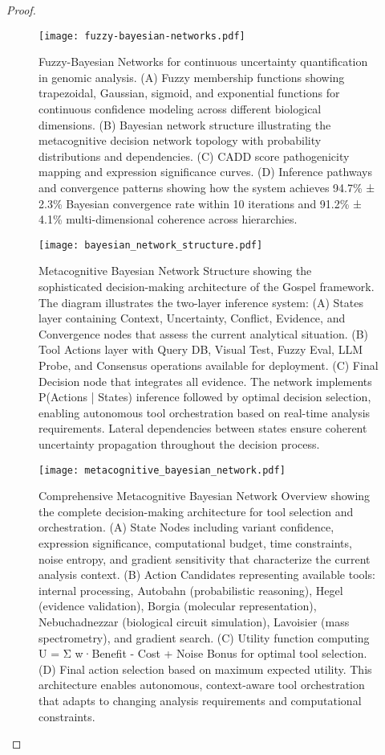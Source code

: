 \documentclass[12pt,a4paper]{article}
\begin{document}
\begin{proof}
\begin{figure}[H]
\centering
\texttt{[image: fuzzy-bayesian-networks.pdf]}
\caption{Fuzzy-Bayesian Networks for continuous uncertainty quantification in genomic analysis. (A) Fuzzy membership functions showing trapezoidal, Gaussian, sigmoid, and exponential functions for continuous confidence modeling across different biological dimensions. (B) Bayesian network structure illustrating the metacognitive decision network topology with probability distributions and dependencies. (C) CADD score pathogenicity mapping and expression significance curves. (D) Inference pathways and convergence patterns showing how the system achieves 94.7\% ± 2.3\% Bayesian convergence rate within 10 iterations and 91.2\% ± 4.1\% multi-dimensional coherence across hierarchies.}
\label{fig:fuzzy-bayesian-networks}
\end{figure}

\begin{figure}[H]
\centering
\texttt{[image: bayesian\_network\_structure.pdf]}
\caption{Metacognitive Bayesian Network Structure showing the sophisticated decision-making architecture of the Gospel framework. The diagram illustrates the two-layer inference system: (A) States layer containing Context, Uncertainty, Conflict, Evidence, and Convergence nodes that assess the current analytical situation. (B) Tool Actions layer with Query DB, Visual Test, Fuzzy Eval, LLM Probe, and Consensus operations available for deployment. (C) Final Decision node that integrates all evidence. The network implements P(Actions | States) inference followed by optimal decision selection, enabling autonomous tool orchestration based on real-time analysis requirements. Lateral dependencies between states ensure coherent uncertainty propagation throughout the decision process.}
\label{fig:metacognitive-network-structure}
\end{figure}

\begin{figure}[H]
\centering
\texttt{[image: metacognitive\_bayesian\_network.pdf]}
\caption{Comprehensive Metacognitive Bayesian Network Overview showing the complete decision-making architecture for tool selection and orchestration. (A) State Nodes including variant confidence, expression significance, computational budget, time constraints, noise entropy, and gradient sensitivity that characterize the current analysis context. (B) Action Candidates representing available tools: internal processing, Autobahn (probabilistic reasoning), Hegel (evidence validation), Borgia (molecular representation), Nebuchadnezzar (biological circuit simulation), Lavoisier (mass spectrometry), and gradient search. (C) Utility function computing U = Σ w·Benefit - Cost + Noise Bonus for optimal tool selection. (D) Final action selection based on maximum expected utility. This architecture enables autonomous, context-aware tool orchestration that adapts to changing analysis requirements and computational constraints.}
\label{fig:metacognitive-overview}
\end{figure}


\end{proof}
\end{document}
